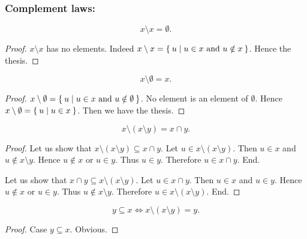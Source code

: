 \documentclass[../../set-theory.tex]{subfiles}
\begin{document}
  \subsubsection*{Complement laws:}

  \begin{forthel}
    \begin{proposition}\label{SetTheory_01_01_402739}
      \[ x \setminus x = \emptyset. \]
    \end{proposition}
    \begin{proof}
      $x \setminus x$ has no elements.
      Indeed $x \setminus x = \Set{u | \text{$u \in x$ and $u \notin x$}}$.
      Hence the thesis.
    \end{proof}

    \begin{proposition}\label{SetTheory_01_01_661163}
      \[ x \setminus \emptyset = x. \]
    \end{proposition}
    \begin{proof}
      $x \setminus \emptyset = \Set{u | \text{$u \in x$ and $u \notin \emptyset$}}$.
      No element is an element of $\emptyset$.
      Hence $x \setminus \emptyset = \Set{u | u \in x}$.
      Then we have the thesis.
    \end{proof}

    \begin{proposition}\label{SetTheory_01_01_408438}
      \[ x \setminus (x \setminus y) = x \cap y. \]
    \end{proposition}
    \begin{proof}
      Let us show that $x \setminus (x \setminus y) \subseteq x \cap y$.
        Let $u \in x \setminus (x \setminus y)$.
        Then $u \in x$ and $u \notin x \setminus y$.
        Hence $u \notin x$ or $u \in y$.
        Thus $u \in y$.
        Therefore $u \in x \cap y$.
      End.

      Let us show that $x \cap y \subseteq x \setminus (x \setminus y)$.
        Let $u \in x \cap y$.
        Then $u \in x$ and $u \in y$.
        Hence $u \notin x$ or $u \in y$.
        Thus $u \notin x \setminus y$.
        Therefore $u \in x \setminus (x \setminus y)$.
      End.
    \end{proof}

    \begin{proposition}\label{SetTheory_01_01_185130}
      \[ y \subseteq x \iff x \setminus (x \setminus y) = y. \]
    \end{proposition}
    \begin{proof}
      Case $y \subseteq x$. Obvious.


\end{proof}
\end{forthel}
\end{document}

